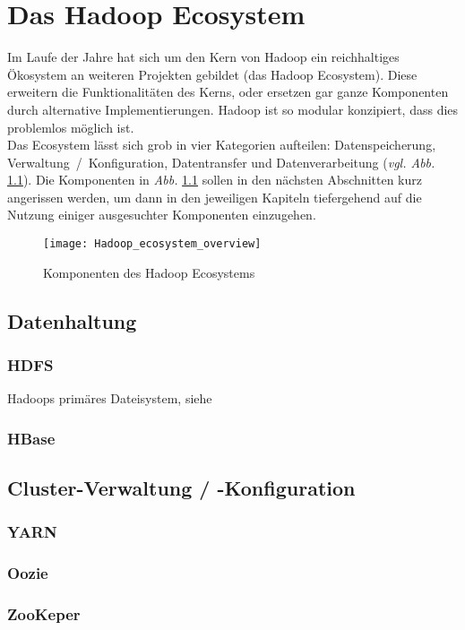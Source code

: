 \chapter{Das Hadoop Ecosystem}
Im Laufe der Jahre hat sich um den Kern von Hadoop ein reichhaltiges Ökosystem an weiteren Projekten gebildet (das Hadoop Ecosystem). Diese erweitern die Funktionalitäten des Kerns, oder ersetzen gar ganze Komponenten durch alternative Implementierungen. Hadoop ist so modular konzipiert, dass dies problemlos möglich ist.  \\
Das Ecosystem lässt sich grob in vier Kategorien aufteilen: Datenspeicherung, Verwaltung~/~Konfiguration, Datentransfer und Datenverarbeitung (\textit{vgl. Abb. }\ref{fig:ecosys}). Die Komponenten in \textit{Abb. }\ref{fig:ecosys} sollen in den nächsten Abschnitten kurz angerissen werden, um dann in den jeweiligen Kapiteln tiefergehend auf die Nutzung einiger ausgesuchter Komponenten einzugehen.

\begin{figure}[ht]
    \centering
    \texttt{[image: Hadoop\_ecosystem\_overview]}
    \caption[Komponenten des Hadoop Ecosystems]{Komponenten des Hadoop Ecosystems\parencite{van_der_weel_hadoop_2015}}
    \label{fig:ecosys}
\end{figure}

\section{Datenhaltung}
\subsection*{HDFS}
Hadoops primäres Dateisystem, siehe 
\subsection*{HBase}

\section{Cluster-Verwaltung / -Konfiguration}
\subsection*{YARN}
\subsection*{Oozie}
\subsection*{ZooKeper}
